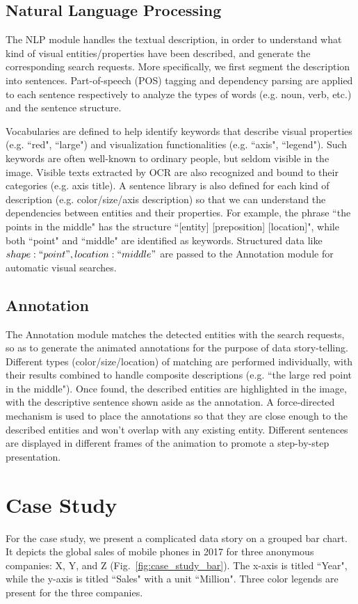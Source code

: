 \documentclass{vgtc}                          %
\begin{document}
\subsection{Natural Language Processing}
 The NLP module handles the textual description, in order to understand what kind of visual entities/properties have been described, and generate the corresponding search requests. More specifically, we first segment the description into sentences. Part-of-speech (POS) tagging and dependency parsing are applied to each sentence respectively to analyze the types of words (e.g. noun, verb, etc.) and the sentence structure.

 Vocabularies are defined to help identify keywords that describe visual properties (e.g. ``red", ``large") and visualization functionalities (e.g. ``axis", ``legend"). Such keywords are often well-known to ordinary people, but seldom visible in the image. Visible texts extracted by OCR are also recognized and bound to their categories (e.g. axis title). A sentence library is also defined for each kind of description (e.g. color/size/axis description) so that we can understand the dependencies between entities and their properties. For example, the phrase ``the points in the middle" has the structure ``[entity] [preposition] [location]", while both ``point" and ``middle" are identified as keywords. Structured data like ${shape: ``point", location: ``middle"}$ are passed to the Annotation module for automatic visual searches.

\subsection{Annotation}
 The Annotation module matches the detected entities with the search requests, so as to generate the animated annotations for the purpose of data story-telling. Different types (color/size/location) of matching are performed individually, with their results combined to handle composite descriptions (e.g. ``the large red point in the middle"). Once found, the described entities are highlighted in the image, with the descriptive sentence shown aside as the annotation.  A force-directed mechanism is used to place the annotations so that they are close enough to the described entities and won't overlap with any existing entity. Different sentences are displayed in different frames of the animation to promote a step-by-step presentation.

 \section{Case Study}
For the case study, we present a complicated data story on a grouped bar chart. It depicts the global sales of mobile phones in 2017 for three anonymous companies: X, Y, and Z (Fig.~\ref{fig:case_study_bar}). The x-axis is titled ``Year", while the y-axis is titled ``Sales" with a unit ``Million". Three color legends are present for the three companies.
\end{document}
